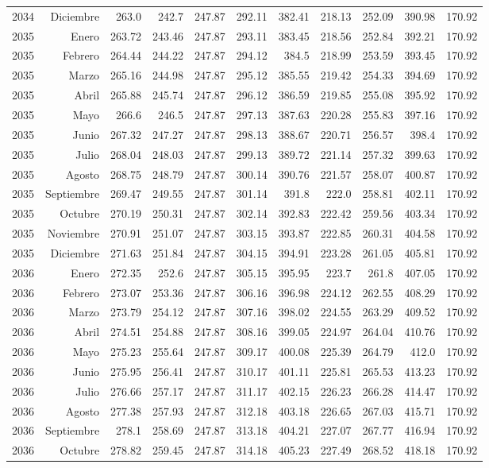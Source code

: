 \documentclass{article}%
\begin{document}
\begin{longtable}{|l r|r|r|r|r|r|r|r|r|r|}
2034&Diciembre&263.0&242.7&247.87&292.11&382.41&218.13&252.09&390.98&170.92\\%
2035&Enero&263.72&243.46&247.87&293.11&383.45&218.56&252.84&392.21&170.92\\%
2035&Febrero&264.44&244.22&247.87&294.12&384.5&218.99&253.59&393.45&170.92\\%
2035&Marzo&265.16&244.98&247.87&295.12&385.55&219.42&254.33&394.69&170.92\\%
2035&Abril&265.88&245.74&247.87&296.12&386.59&219.85&255.08&395.92&170.92\\%
2035&Mayo&266.6&246.5&247.87&297.13&387.63&220.28&255.83&397.16&170.92\\%
2035&Junio&267.32&247.27&247.87&298.13&388.67&220.71&256.57&398.4&170.92\\%
2035&Julio&268.04&248.03&247.87&299.13&389.72&221.14&257.32&399.63&170.92\\%
2035&Agosto&268.75&248.79&247.87&300.14&390.76&221.57&258.07&400.87&170.92\\%
2035&Septiembre&269.47&249.55&247.87&301.14&391.8&222.0&258.81&402.11&170.92\\%
2035&Octubre&270.19&250.31&247.87&302.14&392.83&222.42&259.56&403.34&170.92\\%
2035&Noviembre&270.91&251.07&247.87&303.15&393.87&222.85&260.31&404.58&170.92\\%
2035&Diciembre&271.63&251.84&247.87&304.15&394.91&223.28&261.05&405.81&170.92\\%
2036&Enero&272.35&252.6&247.87&305.15&395.95&223.7&261.8&407.05&170.92\\%
2036&Febrero&273.07&253.36&247.87&306.16&396.98&224.12&262.55&408.29&170.92\\%
2036&Marzo&273.79&254.12&247.87&307.16&398.02&224.55&263.29&409.52&170.92\\%
2036&Abril&274.51&254.88&247.87&308.16&399.05&224.97&264.04&410.76&170.92\\%
2036&Mayo&275.23&255.64&247.87&309.17&400.08&225.39&264.79&412.0&170.92\\%
2036&Junio&275.95&256.41&247.87&310.17&401.11&225.81&265.53&413.23&170.92\\%
2036&Julio&276.66&257.17&247.87&311.17&402.15&226.23&266.28&414.47&170.92\\%
2036&Agosto&277.38&257.93&247.87&312.18&403.18&226.65&267.03&415.71&170.92\\%
2036&Septiembre&278.1&258.69&247.87&313.18&404.21&227.07&267.77&416.94&170.92\\%
2036&Octubre&278.82&259.45&247.87&314.18&405.23&227.49&268.52&418.18&170.92\\%

\end{longtable}
\end{document}
